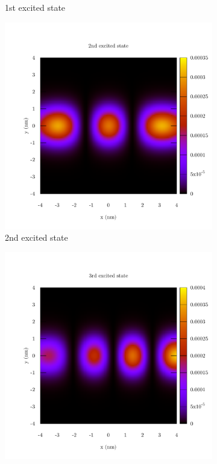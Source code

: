 \documentclass[12pt,a4]{article}
\begin{document}
\begin{figure}[H]
\begin{subfigure}{.33\textwidth}
		\caption{1st excited state}
	\end{subfigure}
	\begin{subfigure}{.33\textwidth}
		\includegraphics[width=\textwidth]{../plots/y_state_2.pdf}
		\caption{2nd excited state}
	\end{subfigure}
	\begin{subfigure}{.33\textwidth}
		\includegraphics[width=\textwidth]{../plots/y_state_3.pdf}

\end{subfigure}
\end{figure}
\end{document}
